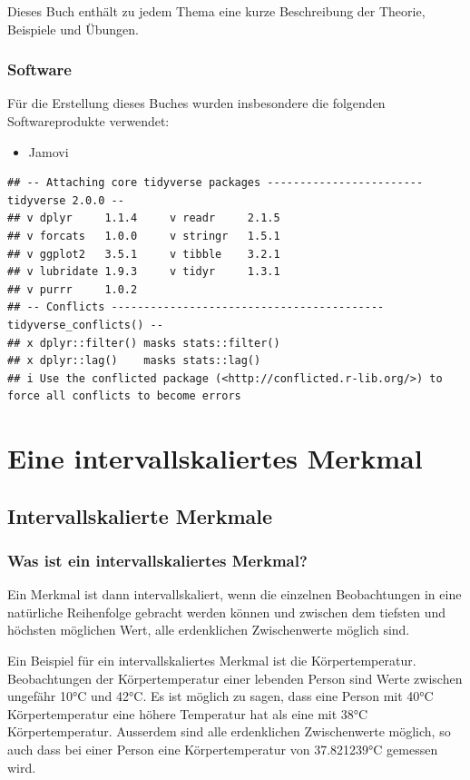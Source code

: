 \documentclass[
]{book}
\providecommand{\tightlist}{%
  \setlength{\itemsep}{0pt}\setlength{\parskip}{0pt}}
\begin{document}
Dieses Buch enthält zu jedem Thema eine kurze Beschreibung der Theorie, Beispiele und Übungen.

\section{Software}\label{software}

Für die Erstellung dieses Buches wurden insbesondere die folgenden Softwareprodukte verwendet:

\begin{itemize}
\tightlist
\item
  Jamovi \citep{R-jmv}
\end{itemize}

\begin{verbatim}
## -- Attaching core tidyverse packages ------------------------ tidyverse 2.0.0 --
## v dplyr     1.1.4     v readr     2.1.5
## v forcats   1.0.0     v stringr   1.5.1
## v ggplot2   3.5.1     v tibble    3.2.1
## v lubridate 1.9.3     v tidyr     1.3.1
## v purrr     1.0.2     
## -- Conflicts ------------------------------------------ tidyverse_conflicts() --
## x dplyr::filter() masks stats::filter()
## x dplyr::lag()    masks stats::lag()
## i Use the conflicted package (<http://conflicted.r-lib.org/>) to force all conflicts to become errors
\end{verbatim}

\part{Eine intervallskaliertes Merkmal}\label{part-eine-intervallskaliertes-merkmal}

\chapter{Intervallskalierte Merkmale}\label{intervallskalierte-merkmale}

\section{Was ist ein intervallskaliertes Merkmal?}\label{was-ist-ein-intervallskaliertes-merkmal}

Ein Merkmal ist dann intervallskaliert, wenn die einzelnen Beobachtungen in eine natürliche Reihenfolge gebracht werden können und zwischen dem tiefsten und höchsten möglichen Wert, alle erdenklichen Zwischenwerte möglich sind.

Ein Beispiel für ein intervallskaliertes Merkmal ist die Körpertemperatur. Beobachtungen der Körpertemperatur einer lebenden Person sind Werte zwischen ungefähr 10°C und 42°C. Es ist möglich zu sagen, dass eine Person mit 40°C Körpertemperatur eine höhere Temperatur hat als eine mit 38°C Körpertemperatur. Ausserdem sind alle erdenklichen Zwischenwerte möglich, so auch dass bei einer Person eine Körpertemperatur von 37.821239°C gemessen wird.
\end{document}

